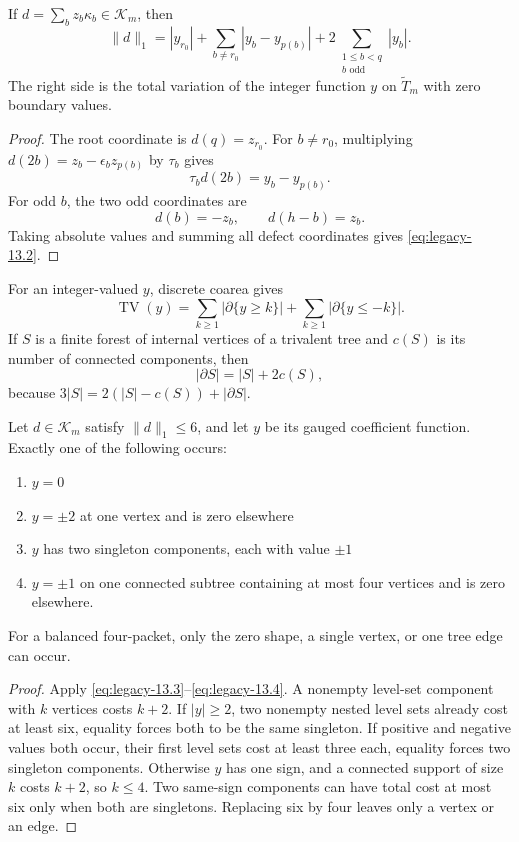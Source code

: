 \begin{manuscriptclaim}
If \(d=\sum_bz_b\kappa_b\in\mathcal K_m\), then
\begin{equation}\label{eq:legacy-13.2}
\boxed{
\|d\|_1
=|y_{r_0}|
+\sum_{b\ne r_0}|y_b-y_{p(b)}|
+2\sum_{\substack{1\le b<q\\ b\text{ odd}}}|y_b|.
}\end{equation}
The right side is the total variation of the integer function \(y\) on \(\widetilde T_m\) with zero boundary values.
\end{manuscriptclaim}
\begin{proof}
The root coordinate is \(d(q)=z_{r_0}\). For \(b\ne r_0\), multiplying
\(d(2b)=z_b-\epsilon_bz_{p(b)}\) by \(\tau_b\) gives
\[
\tau_bd(2b)=y_b-y_{p(b)}.
\]
For odd \(b\), the two odd coordinates are
\[
d(b)=-z_b,
\qquad
d(h-b)=z_b.
\]
Taking absolute values and summing all defect coordinates gives \eqref{eq:legacy-13.2}.
\end{proof}

For an integer-valued \(y\), discrete coarea gives
\begin{equation}\label{eq:legacy-13.3}
\operatorname{TV}(y)
=
\sum_{k\ge1}|\partial\{y\ge k\}|
+
\sum_{k\ge1}|\partial\{y\le-k\}|.\end{equation}
If \(S\) is a finite forest of internal vertices of a trivalent tree and \(c(S)\) is its number of connected components, then
\begin{equation}\label{eq:legacy-13.4}
|\partial S|=|S|+2c(S),\end{equation}
because \(3|S|=2(|S|-c(S))+|\partial S|\).

\begin{manuscriptclaim}
Let \(d\in\mathcal K_m\) satisfy \(\|d\|_1\le6\), and let \(y\) be its gauged coefficient function. Exactly one of the following occurs:
\begin{enumerate}
\item \(y=0\)
\item \(y=\pm2\) at one vertex and is zero elsewhere
\item \(y\) has two singleton components, each with value \(\pm1\)
\item \(y=\pm1\) on one connected subtree containing at most four vertices and is zero elsewhere.
\end{enumerate}
For a balanced four-packet, only the zero shape, a single vertex, or one tree edge can occur.
\end{manuscriptclaim}
\begin{proof}
Apply \eqref{eq:legacy-13.3}--\eqref{eq:legacy-13.4}. A nonempty level-set component with \(k\) vertices costs \(k+2\). If \(|y|\ge2\), two nonempty nested level sets already cost at least six, equality forces both to be the same singleton. If positive and negative values both occur, their first level sets cost at least three each, equality forces two singleton components. Otherwise \(y\) has one sign, and a connected support of size \(k\) costs \(k+2\), so \(k\le4\). Two same-sign components can have total cost at most six only when both are singletons. Replacing six by four leaves only a vertex or an edge.
\end{proof}

